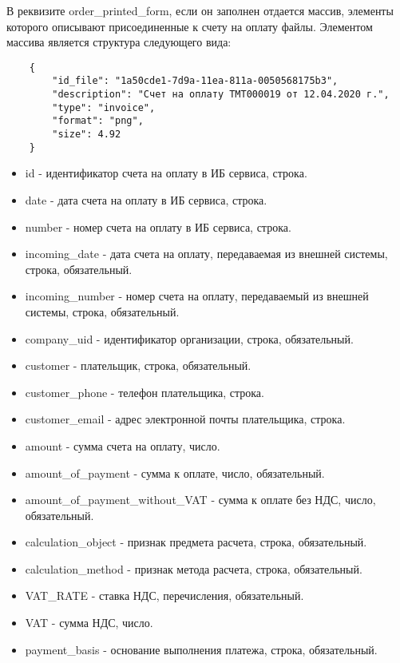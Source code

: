 \documentclass[11pt, a4paper]{article}
\begin{document}
В реквизите order\_printed\_form, если он заполнен отдается массив, элементы которого описывают присоединенные к счету на оплату файлы. Элементом массива является структура следующего вида:

\begin{listing}[H]
	\begin{verbatim}
	{
		"id_file": "1a50cde1-7d9a-11ea-811a-0050568175b3",
		"description": "Счет на оплату ТМТ000019 от 12.04.2020 г.",
		"type": "invoice",
		"format": "png",
		"size": 4.92
	}
	\end{verbatim}
	\caption{Структура, описывающая файл, прикрепленный к счету на оплату.}
\end{listing}

\begin{itemize}
	\item id - идентификатор счета на оплату в ИБ сервиса, строка.
	\item date - дата счета на оплату в ИБ сервиса, строка.
	\item number - номер счета на оплату в ИБ сервиса, строка.
	\item incoming\_date - дата счета на оплату, передаваемая из внешней системы, строка, обязательный.
	\item incoming\_number - номер счета на оплату, передаваемый из внешней системы, строка, обязательный.
	\item company\_uid - идентификатор организации, строка, обязательный.
	\item customer - плательщик, строка, обязательный.
	\item customer\_phone - телефон плательщика, строка.
	\item customer\_email - адрес электронной почты плательщика, строка.
	\item amount - сумма счета на оплату, число.
	\item amount\_of\_payment - сумма к оплате, число, обязательный.
	\item amount\_of\_payment\_without\_VAT - сумма к оплате без НДС, число, обязательный.
	\item calculation\_object - признак предмета расчета, строка, обязательный.
	\item calculation\_method - признак метода расчета, строка, обязательный.
	\item VAT\_RATE - ставка НДС, перечисления, обязательный.
	\item VAT - сумма НДС, число.
	\item payment\_basis - основание выполнения платежа, строка, обязательный.

\end{itemize}
\end{document}

